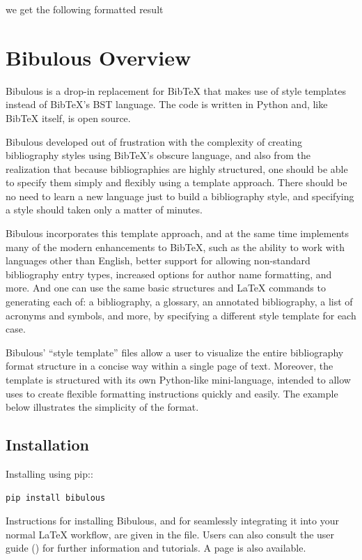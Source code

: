 \documentclass[letterpaper,10pt,english]{sphinxmanual}
\begin{document}
we get the following formatted result


\chapter{Bibulous Overview}
\label{index:bibulous-overview}
Bibulous is a drop-in replacement for BibTeX that makes use of style templates instead of BibTeX's BST language. The code is written in Python and, like BibTeX itself, is open source.

Bibulous developed out of frustration with the complexity of creating bibliography styles using BibTeX's obscure language, and also from the realization that because bibliographies are highly structured, one should be able to specify them simply and flexibly using a template approach. There should be no need to learn a new language just to build a bibliography style, and specifying a style should taken only a matter of minutes.

Bibulous incorporates this template approach, and at the same time implements many of the modern enhancements to BibTeX, such as the ability to work with languages other than English, better support for allowing non-standard bibliography entry types, increased options for author name formatting, and more. And one can use the same basic structures and LaTeX commands to generating each of: a bibliography, a glossary, an annotated bibliography, a list of acronyms and symbols, and more, by specifying a different style template for each case.

Bibulous' “style template” files allow a user to visualize the entire bibliography format structure in a concise way within a single page of text. Moreover, the template is structured with its own Python-like mini-language, intended to allow uses to create flexible formatting instructions quickly and easily. The example below illustrates the simplicity of the format.


\section{Installation}
\label{index:installation}
Installing using pip::

\begin{Verbatim}[commandchars=\\\{\}]
pip install bibulous
\end{Verbatim}

Instructions for installing Bibulous, and for seamlessly integrating it into your normal LaTeX workflow, are given in the  file. Users can also consult the user guide () for further information and tutorials. A  page is also available.
\end{document}
